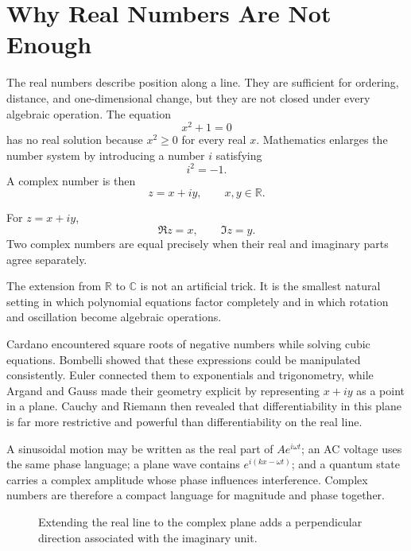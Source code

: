 \section{Why Real Numbers Are Not Enough}
\label{sec:ch5-why-complex}

The real numbers describe position along a line. They are sufficient for ordering, distance, and one-dimensional change, but they are not closed under every algebraic operation. The equation
\[
x^2+1=0
\]
has no real solution because $x^2\geq0$ for every real $x$. Mathematics enlarges the number system by introducing a number $i$ satisfying
\[
\boxed{i^2=-1}.
\]
A complex number is then
\[
z=x+iy,\qquad x,y\in\mathbb{R}.
\]

\begin{definitionbox}
For $z=x+iy$,
\[
\Re z=x,\qquad \Im z=y.
\]
Two complex numbers are equal precisely when their real and imaginary parts agree separately.
\end{definitionbox}

The extension from $\mathbb R$ to $\mathbb C$ is not an artificial trick. It is the smallest natural setting in which polynomial equations factor completely and in which rotation and oscillation become algebraic operations.

\begin{historybox}
Cardano encountered square roots of negative numbers while solving cubic equations. Bombelli showed that these expressions could be manipulated consistently. Euler connected them to exponentials and trigonometry, while Argand and Gauss made their geometry explicit by representing $x+iy$ as a point in a plane. Cauchy and Riemann then revealed that differentiability in this plane is far more restrictive and powerful than differentiability on the real line.
\end{historybox}

\begin{physicalbox}
A sinusoidal motion may be written as the real part of $Ae^{i\omega t}$; an AC voltage uses the same phase language; a plane wave contains $e^{i(kx-\omega t)}$; and a quantum state carries a complex amplitude whose phase influences interference. Complex numbers are therefore a compact language for magnitude and phase together.
\end{physicalbox}

\begin{figure}[htbp]
\centering

\caption{Extending the real line to the complex plane adds a perpendicular direction associated with the imaginary unit.}
\label{fig:ch5-number-extension}
\end{figure}
